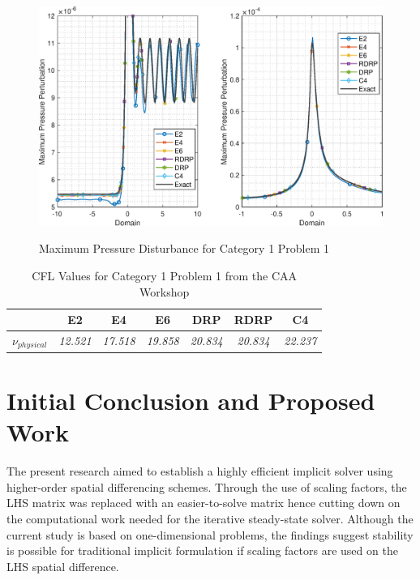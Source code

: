 \documentclass[conf]{new-aiaa}
\begin{document}
\begin{figure}[hbtp!]
	\centering
	{\includegraphics[width=1.0\textwidth]{Figures/C1P1_MaxDisturbance_zoom}}
	\caption{Maximum Pressure Disturbance for Category 1 Problem 1}
	\label{fig:Unsteady_C1P1_closeup}
\end{figure}

\begin{table}[htp!]
\centering
\caption{CFL Values for Category 1 Problem 1 from the CAA Workshop}
\label{tab:C1P1_CFL}
\begin{tabular}{|l|c|c|c|c|c|c|}
\hline
 & \multicolumn{1}{c|}{\textbf{E2}} & \multicolumn{1}{c|}{\textbf{E4}} & \multicolumn{1}{c|}{\textbf{E6}} & \multicolumn{1}{c|}{\textbf{DRP}} & \multicolumn{1}{c|}{\textbf{RDRP}}& \multicolumn{1}{c|}{\textbf{C4}}\\ \hline
\textbf{$\nu_{physical}$} & \textit{12.521} & \textit{17.518} & \textit{19.858} & \textit{20.834} & \textit{20.834} & \textit{22.237}\\ \hline
\end{tabular}
\end{table}


\section{Initial Conclusion and Proposed Work}
The present research aimed to establish a highly efficient implicit solver using higher-order spatial differencing schemes. 
Through the use of scaling factors, the LHS matrix was replaced with an easier-to-solve matrix hence cutting down on the computational work needed for the iterative steady-state solver. 
Although the current study is based on one-dimensional problems, the findings suggest stability is possible for traditional implicit formulation if scaling factors are used on the LHS spatial difference. 
\end{document}
